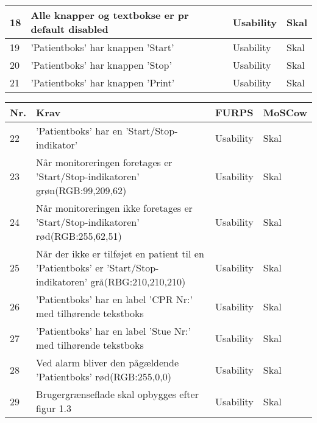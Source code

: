 \begin{table}[H]
\begin{tabular}{|p{0.5cm}|p{6cm}|p{3cm}|p{3cm}|}
18 & Alle knapper og textbokse er pr default disabled & Usability & Skal \\\hline
19 & 'Patientboks' har knappen 'Start' & Usability & Skal \\\hline
20 & 'Patientboks' har knappen 'Stop' & Usability & Skal \\\hline
21 & 'Patientboks' har knappen 'Print'& Usability & Skal \\\hline
\end{tabular}
\end{table}

\begin{table}[H]
\begin{tabular}{|p{0.5cm}|p{6cm}|p{3cm}|p{3cm}|}
\hline
\textbf{Nr.} & \textbf{Krav} & \textbf{FURPS}& \textbf{MoSCow} \\\hline
22 & 'Patientboks' har en 'Start/Stop-indikator' & Usability & Skal \\\hline
23 & Når monitoreringen foretages er 'Start/Stop-indikatoren' grøn(RGB:99,209,62) & Usability & Skal \\\hline
24 & Når monitoreringen ikke foretages er 'Start/Stop-indikatoren' rød(RGB:255,62,51)& Usability & Skal \\\hline
25 & Når der ikke er tilføjet en patient til en 'Patientboks' er 'Start/Stop-indikatoren' grå(RBG:210,210,210) & Usability & Skal \\\hline
26 & 'Patientboks' har en label 'CPR Nr:' med tilhørende tekstboks & Usability & Skal \\\hline
27 & 'Patientboks' har en label 'Stue Nr:' med tilhørende tekstboks & Usability& Skal \\\hline
28 & Ved alarm bliver den pågældende 'Patientboks' rød(RGB:255,0,0) & Usability & Skal \\\hline
29 & Brugergrænseflade skal opbygges efter figur 1.3 &  Usability & Skal \\\hline
\end{tabular}
\end{table}

